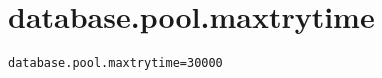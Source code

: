 \section{database.pool.maxtrytime}
\label{configuration:DatabasePoolMaxtrytime}
\ClearAPI
\TODO
{}
\begin{lstlisting}[style=Props,caption={Usage example for \textit{database.pool.maxtrytime}}]
database.pool.maxtrytime=30000
\end{lstlisting}